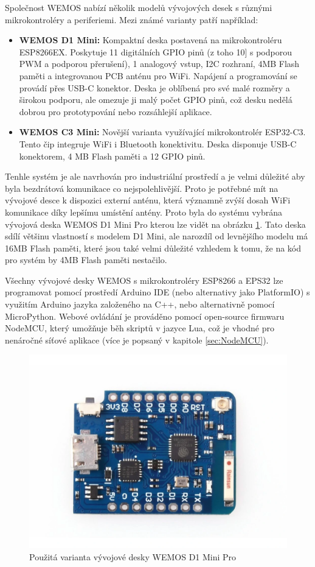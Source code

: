 Společnost WEMOS nabízí několik modelů vývojových desek s různými mikrokontroléry a periferiemi. Mezi známé varianty patří například:
\begin{itemize}
	\item \textbf{WEMOS D1 Mini:} Kompaktní deska postavená na mikrokontroléru ESP8266EX. Poskytuje 11 digitálních GPIO pinů (z toho 10] s podporou PWM a podporou přerušení), 1 analogový vstup, I2C rozhraní, 4MB Flash paměti a integrovanou PCB anténu pro WiFi. Napájení a programování se provádí přes USB-C konektor. Deska je oblíbená pro své malé rozměry a širokou podporu, ale omezuje ji malý počet GPIO pinů, což desku nedělá dobrou pro prototypování nebo rozsáhlejší aplikace.
	\item \textbf{WEMOS C3 Mini:} Novější varianta využívající mikrokontrolér ESP32-C3. Tento čip integruje WiFi i Bluetooth konektivitu. Deska disponuje USB-C konektorem, 4 MB Flash paměti a 12 GPIO pinů.
\end{itemize}

Tenhle systém je ale navrhován pro industriální prostředí a je velmi důležité aby byla bezdrátová komunikace co nejspolehlivější. Proto je potřebné mít na vývojové desce k dispozici externí anténu, která významně zvýší dosah WiFi komunikace díky lepšímu umístění antény. Proto byla do systému vybrána vývojová deska WEMOS D1 Mini Pro kterou lze vidět na obrázku \ref{fig:WEMOSD1MiniPro}. Tato deska sdílí většinu vlastností s modelem D1 Mini, ale narozdíl od levnějšího modelu má 16MB Flash paměti, které jsou také velmi důležité vzhledem k tomu, že na kód pro systém by 4MB Flash paměti nestačilo.

Všechny vývojové desky WEMOS s mikrokontroléry ESP8266 a EPS32 lze programovat pomocí prostředí Arduino IDE (nebo alternativy jako PlatformIO) s využitím Arduino jazyka založeného na C++, nebo alternativně pomocí MicroPython. Webové ovládání je prováděno pomocí open-source firmwaru NodeMCU, který umožňuje běh skriptů v jazyce Lua, což je vhodné pro nenáročné síťové aplikace (více je popsaný v kapitole \ref{sec:NodeMCU}).

\begin{figure}[hptb]
	\centering
	\includegraphics[width=0.8\linewidth]{images/WEMOS_D1_Mini_Pro.png}
	\caption{Použitá varianta vývojové desky WEMOS D1 Mini Pro \cite{WEMOSD1MiniPro}}
	\label{fig:WEMOSD1MiniPro}
\end{figure}

